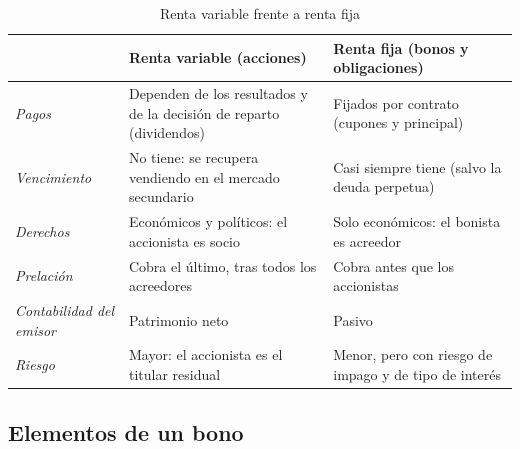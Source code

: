 \documentclass[11pt]{article}
\begin{document}
\begin{table}[H]
\centering
\caption{Renta variable frente a renta fija}\label{tab:renta-fija-variable}
\small
\begin{tabular}{>{\raggedright\arraybackslash}m{3.2cm}>{\raggedright\arraybackslash}m{5.6cm}>{\raggedright\arraybackslash}m{5.6cm}}
\toprule
\rowcolor{tceeazulpalido} & \textbf{Renta variable (acciones)} & \textbf{Renta fija (bonos y obligaciones)}\\
\midrule
\emph{Pagos} & Dependen de los resultados y de la decisión de reparto (dividendos) & Fijados por contrato (cupones y principal)\\
\addlinespace[0.2em]
\emph{Vencimiento} & No tiene: se recupera vendiendo en el mercado secundario & Casi siempre tiene (salvo la deuda perpetua)\\
\addlinespace[0.2em]
\emph{Derechos} & Económicos y políticos: el accionista es socio & Solo económicos: el bonista es acreedor\\
\addlinespace[0.2em]
\emph{Prelación} & Cobra el último, tras todos los acreedores & Cobra antes que los accionistas\\
\addlinespace[0.2em]
\emph{Contabilidad del emisor} & Patrimonio neto & Pasivo\\
\addlinespace[0.2em]
\rowcolor{tceesalvia}\emph{Riesgo} & Mayor: el accionista es el titular residual & Menor, pero con riesgo de impago y de tipo de interés\\
\bottomrule
\end{tabular}
\end{table}

\subsection{Elementos de un bono}\label{sec:elementos}
\end{document}
